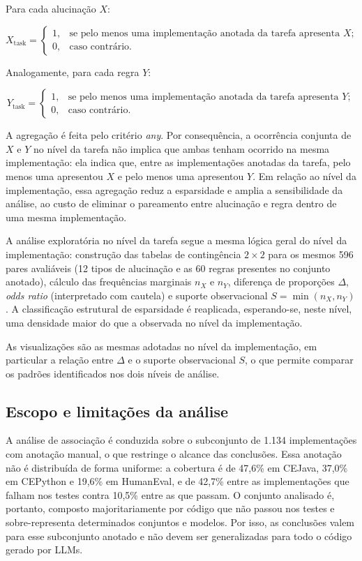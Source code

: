 Para cada alucinação $X$:

\[
X_{\text{task}}=
\begin{cases}
1, & \text{se pelo menos uma implementação anotada da tarefa apresenta }X;\\
0, & \text{caso contrário.}
\end{cases}
\]

Analogamente, para cada regra $Y$:

\[
Y_{\text{task}}=
\begin{cases}
1, & \text{se pelo menos uma implementação anotada da tarefa apresenta }Y;\\
0, & \text{caso contrário.}
\end{cases}
\]

A agregação é feita pelo critério \textit{any}. Por consequência, a ocorrência conjunta de $X$ e $Y$ no nível da tarefa não implica que ambas tenham ocorrido na mesma implementação: ela indica que, entre as implementações anotadas da tarefa, pelo menos uma apresentou $X$ e pelo menos uma apresentou $Y$. Em relação ao nível da implementação, essa agregação reduz a esparsidade e amplia a sensibilidade da análise, ao custo de eliminar o pareamento entre alucinação e regra dentro de uma mesma implementação.

A análise exploratória no nível da tarefa segue a mesma lógica geral do nível da implementação: construção das tabelas de contingência $2\times2$ para os mesmos 596 pares avaliáveis (12 tipos de alucinação e as 60 regras presentes no conjunto anotado), cálculo das frequências marginais $n_X$ e $n_Y$, diferença de proporções $\Delta$, \textit{odds ratio} (interpretado com cautela) e suporte observacional $S=\min(n_X,n_Y)$. A classificação estrutural de esparsidade é reaplicada, esperando-se, neste nível, uma densidade maior do que a observada no nível da implementação.

As visualizações são as mesmas adotadas no nível da implementação, em particular a relação entre $\Delta$ e o suporte observacional $S$, o que permite comparar os padrões identificados nos dois níveis de análise.

\subsection{Escopo e limitações da análise}

A análise de associação é conduzida sobre o subconjunto de 1.134 implementações com anotação manual, o que restringe o alcance das conclusões. Essa anotação não é distribuída de forma uniforme: a cobertura é de 47,6\% em CEJava, 37,0\% em CEPython e 19,6\% em HumanEval, e de 42,7\% entre as implementações que falham nos testes contra 10,5\% entre as que passam. O conjunto analisado é, portanto, composto majoritariamente por código que não passou nos testes e sobre-representa determinados conjuntos e modelos. Por isso, as conclusões valem para esse subconjunto anotado e não devem ser generalizadas para todo o código gerado por LLMs.

